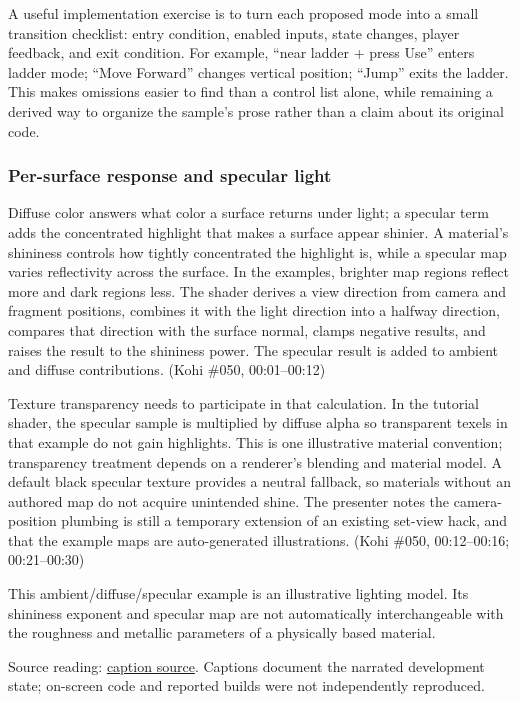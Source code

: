 A useful implementation exercise is to turn each proposed mode into a small transition checklist: entry condition, enabled inputs, state changes, player feedback, and exit condition. For example, ``near ladder + press Use'' enters ladder mode; ``Move Forward'' changes vertical position; ``Jump'' exits the ladder. This makes omissions easier to find than a control list alone, while remaining a derived way to organize the sample's prose rather than a claim about its original code.

\subsubsection{Per-surface response and specular light}\label{06-engine-ii-ch026-per-surface-response-and-specular-light}

Diffuse color answers what color a surface returns under light; a specular term adds the concentrated highlight that makes a surface appear shinier. A material's shininess controls how tightly concentrated the highlight is, while a specular map varies reflectivity across the surface. In the examples, brighter map regions reflect more and dark regions less. The shader derives a view direction from camera and fragment positions, combines it with the light direction into a halfway direction, compares that direction with the surface normal, clamps negative results, and raises the result to the shininess power. The specular result is added to ambient and diffuse contributions. (Kohi \#050, 00:01--00:12)

Texture transparency needs to participate in that calculation. In the tutorial shader, the specular sample is multiplied by diffuse alpha so transparent texels in that example do not gain highlights. This is one illustrative material convention; transparency treatment depends on a renderer's blending and material model. A default black specular texture provides a neutral fallback, so materials without an authored map do not acquire unintended shine. The presenter notes the camera-position plumbing is still a temporary extension of an existing set-view hack, and that the example maps are auto-generated illustrations. (Kohi \#050, 00:12--00:16; 00:21--00:30)

This ambient/diffuse/specular example is an illustrative lighting model. Its shininess exponent and specular map are not automatically interchangeable with the roughness and metallic parameters of a physically based material.

Source reading: \href{https://www.youtube.com/watch?v=9O--xSmf5NU}{caption source}. Captions document the narrated development state; on-screen code and reported builds were not independently reproduced.

